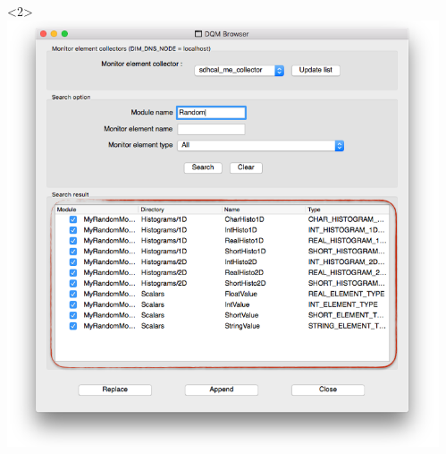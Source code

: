 \documentclass[8pt]{beamer}
\begin{document}
\begin{frame}
\begin{overlayarea}{\textwidth}{\textheight}
\begin{columns}
	\begin{center}
         \begin{onlyenv}<2>\includegraphics[width=1.1\textwidth]{figs/Browser/Browser_SearchResult}\end{onlyenv}
               \end{center}

         \begin{itemize}
      \end{itemize}

           \end{columns}
               \end{overlayarea}

  \end{frame}
\end{document}
